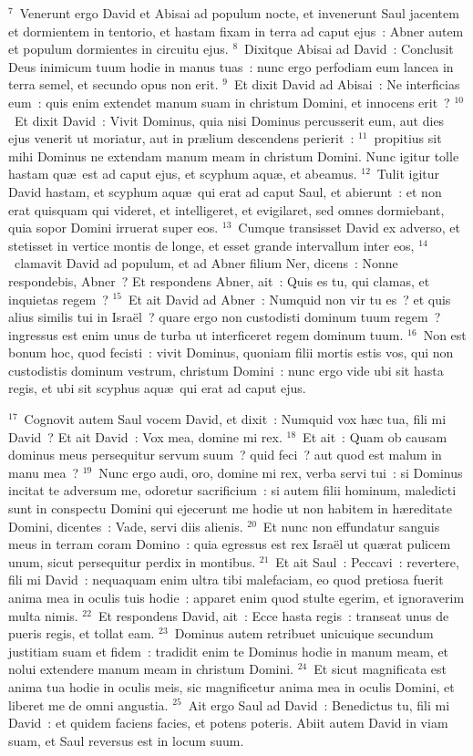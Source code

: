 ${}^{7}$~Venerunt ergo David et Abisai ad populum nocte, et invenerunt Saul jacentem et dormientem in tentorio, et hastam fixam in terra ad caput ejus~: Abner autem et populum dormientes in circuitu ejus.
${}^{8}$~Dixitque Abisai ad David~: Conclusit Deus inimicum tuum hodie in manus tuas~: nunc ergo perfodiam eum lancea in terra semel, et secundo opus non erit.
${}^{9}$~Et dixit David ad Abisai~: Ne interficias eum~: quis enim extendet manum suam in christum Domini, et innocens erit~?
${}^{10}$~Et dixit David~: Vivit Dominus, quia nisi Dominus percusserit eum, aut dies ejus venerit ut moriatur, aut in pr\ae lium descendens perierit~:
${}^{11}$~propitius sit mihi Dominus ne extendam manum meam in christum Domini. Nunc igitur tolle hastam qu\ae\ est ad caput ejus, et scyphum aqu\ae , et abeamus.
${}^{12}$~Tulit igitur David hastam, et scyphum aqu\ae\ qui erat ad caput Saul, et abierunt~: et non erat quisquam qui videret, et intelligeret, et evigilaret, sed omnes dormiebant, quia sopor Domini irruerat super eos.
${}^{13}$~Cumque transisset David ex adverso, et stetisset in vertice montis de longe, et esset grande intervallum inter eos,
${}^{14}$~clamavit David ad populum, et ad Abner filium Ner, dicens~: Nonne respondebis, Abner~? Et respondens Abner, ait~: Quis es tu, qui clamas, et inquietas regem~?
${}^{15}$~Et ait David ad Abner~: Numquid non vir tu es~? et quis alius similis tui in Isra\"el~? quare ergo non custodisti dominum tuum regem~? ingressus est enim unus de turba ut interficeret regem dominum tuum.
${}^{16}$~Non est bonum hoc, quod fecisti~: vivit Dominus, quoniam filii mortis estis vos, qui non custodistis dominum vestrum, christum Domini~: nunc ergo vide ubi sit hasta regis, et ubi sit scyphus aqu\ae\ qui erat ad caput ejus.


${}^{17}$~Cognovit autem Saul vocem David, et dixit~: Numquid vox h\ae c tua, fili mi David~? Et ait David~: Vox mea, domine mi rex.
${}^{18}$~Et ait~: Quam ob causam dominus meus persequitur servum suum~? quid feci~? aut quod est malum in manu mea~?
${}^{19}$~Nunc ergo audi, oro, domine mi rex, verba servi tui~: si Dominus incitat te adversum me, odoretur sacrificium~: si autem filii hominum, maledicti sunt in conspectu Domini qui ejecerunt me hodie ut non habitem in h\ae reditate Domini, dicentes~: Vade, servi diis alienis.
${}^{20}$~Et nunc non effundatur sanguis meus in terram coram Domino~: quia egressus est rex Isra\"el ut qu\ae rat pulicem unum, sicut persequitur perdix in montibus.
${}^{21}$~Et ait Saul~: Peccavi~: revertere, fili mi David~: nequaquam enim ultra tibi malefaciam, eo quod pretiosa fuerit anima mea in oculis tuis hodie~: apparet enim quod stulte egerim, et ignoraverim multa nimis.
${}^{22}$~Et respondens David, ait~: Ecce hasta regis~: transeat unus de pueris regis, et tollat eam.
${}^{23}$~Dominus autem retribuet unicuique secundum justitiam suam et fidem~: tradidit enim te Dominus hodie in manum meam, et nolui extendere manum meam in christum Domini.
${}^{24}$~Et sicut magnificata est anima tua hodie in oculis meis, sic magnificetur anima mea in oculis Domini, et liberet me de omni angustia.
${}^{25}$~Ait ergo Saul ad David~: Benedictus tu, fili mi David~: et quidem faciens facies, et potens poteris. Abiit autem David in viam suam, et Saul reversus est in locum suum.


